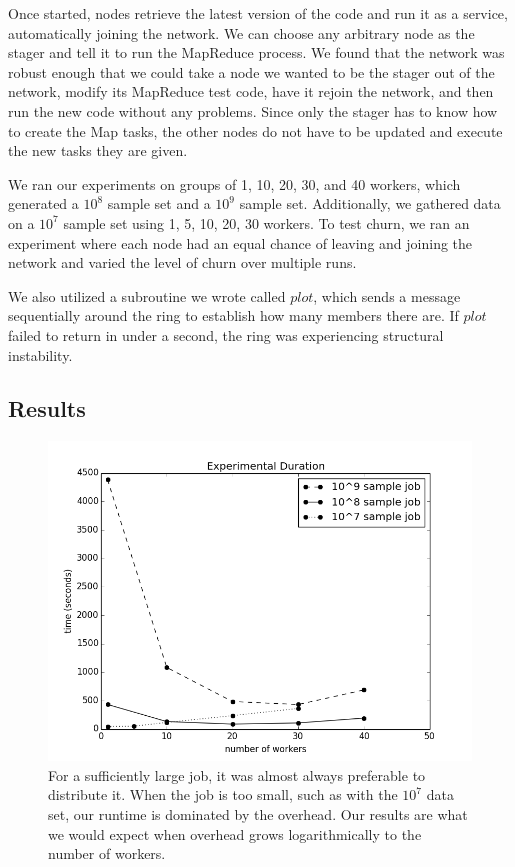 Once started, nodes retrieve the latest version of the code and run it as a service, automatically joining the network.  We can choose any arbitrary node as the stager and tell it to run the MapReduce process. We found that the network was robust enough that we could take a node we wanted to be the stager out of the network, modify its MapReduce test code, have it rejoin the network, and then run the new code without any problems. Since only the stager has to know how to create the Map tasks, the other nodes do not have to be updated and execute the new tasks they are given.

We ran our experiments on groups of 1, 10, 20, 30, and 40 workers, which generated a $10^{8}$ sample set and a $10^{9}$ sample set.  Additionally, we gathered data on a $10^{7}$ sample set using 1, 5, 10, 20, 30 workers.  To test churn, we ran an experiment where each node had an equal chance of leaving and joining the network and varied the level of churn over multiple runs.  

We also utilized a subroutine we wrote called $plot$, which sends a message sequentially around the ring to establish how many members there are.  If $plot$ failed to return in under a second, the ring was experiencing structural instability.

\subsection{Results}

\begin{figure}
	\centering
	\includegraphics[width=0.7\linewidth]{figs/expTime}
	\caption[ChordReduce workers vs runtime]{For a sufficiently large job, it was almost always preferable to distribute it.  When the job is too small, such as with the $10^{7}$ data set, our runtime is dominated by the overhead.  Our results are what we would expect when overhead grows logarithmically to the number of workers.}
	\label{fig:expTime}
\end{figure}


